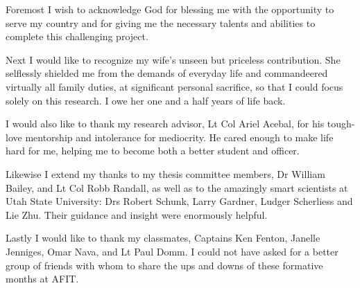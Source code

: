 \begin{acknowledgements}
Foremost I wish to acknowledge God for blessing me with the
opportunity to serve my country and for giving me the necessary
talents and abilities to complete this challenging project.

Next I would like to recognize my wife's unseen but priceless
contribution.  She selflessly shielded me from the demands of
everyday life and commandeered virtually all family duties, at
significant personal sacrifice, so that I could focus solely on this
research.  I owe her one and a half years of life back.

I would also like to thank my research advisor, Lt Col Ariel
Acebal, for his tough-love mentorship and intolerance for mediocrity.
He cared enough to make life hard for me, helping me to become both a
better student and officer.

Likewise I extend my thanks to my thesis committee members, Dr 
William Bailey, and Lt Col Robb Randall, as well as to the
amazingly smart scientists at Utah State University: Drs Robert
Schunk, Larry Gardner, Ludger Scherliess and Lie Zhu.  Their guidance
and insight were enormously helpful.

Lastly I would like to thank my classmates, Captains Ken Fenton,
Janelle Jenniges, Omar Nava, and Lt Paul Domm.  I could not have
asked for a better group of friends with whom to share the ups and
downs of these formative months at AFIT.

\end{acknowledgements}

